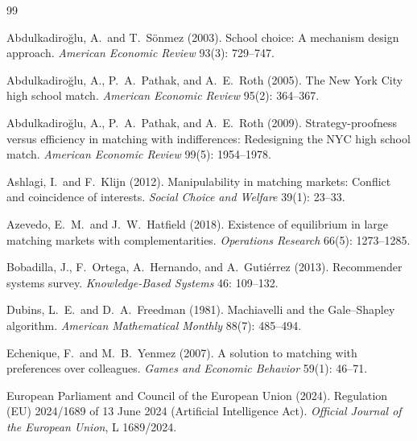 \documentclass[11pt,a4paper]{article}
\begin{document}
\begin{thebibliography}{99}

Abdulkadiroğlu, A.\ and T.\ Sönmez (2003).
\newblock School choice: A mechanism design approach.
\newblock \emph{American Economic Review} 93(3): 729--747.

Abdulkadiroğlu, A., P.\ A.\ Pathak, and A.\ E.\ Roth (2005).
\newblock The New York City high school match.
\newblock \emph{American Economic Review} 95(2): 364--367.

Abdulkadiroğlu, A., P.\ A.\ Pathak, and A.\ E.\ Roth (2009).
\newblock Strategy-proofness versus efficiency in matching with indifferences: Redesigning the NYC high school match.
\newblock \emph{American Economic Review} 99(5): 1954--1978.

Ashlagi, I.\ and F.\ Klijn (2012).
\newblock Manipulability in matching markets: Conflict and coincidence of interests.
\newblock \emph{Social Choice and Welfare} 39(1): 23--33.

Azevedo, E.\ M.\ and J.\ W.\ Hatfield (2018).
\newblock Existence of equilibrium in large matching markets with complementarities.
\newblock \emph{Operations Research} 66(5): 1273--1285.

Bobadilla, J., F.\ Ortega, A.\ Hernando, and A.\ Gutiérrez (2013).
\newblock Recommender systems survey.
\newblock \emph{Knowledge-Based Systems} 46: 109--132.

Dubins, L.\ E.\ and D.\ A.\ Freedman (1981).
\newblock Machiavelli and the Gale--Shapley algorithm.
\newblock \emph{American Mathematical Monthly} 88(7): 485--494.

Echenique, F.\ and M.\ B.\ Yenmez (2007).
\newblock A solution to matching with preferences over colleagues.
\newblock \emph{Games and Economic Behavior} 59(1): 46--71.

European Parliament and Council of the European Union (2024).
\newblock Regulation (EU) 2024/1689 of 13 June 2024 (Artificial Intelligence Act).
\newblock \emph{Official Journal of the European Union}, L 1689/2024.


\end{thebibliography}
\end{document}
